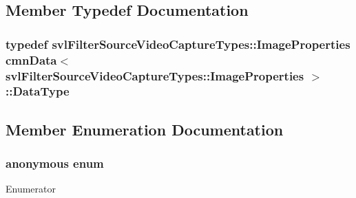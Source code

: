 \subsection{Member Typedef Documentation}
\hypertarget{classcmn_data_3_01svl_filter_source_video_capture_types_1_1_image_properties_01_4_a5e4f9ec9d3c7fa6c707332abbc73cf39}{}
\subsubsection[{Data\+Type}]{\setlength{\rightskip}{0pt plus 5cm}typedef {\bf svl\+Filter\+Source\+Video\+Capture\+Types\+::\+Image\+Properties} {\bf cmn\+Data}$<$ {\bf svl\+Filter\+Source\+Video\+Capture\+Types\+::\+Image\+Properties} $>$\+::{\bf Data\+Type}}\label{classcmn_data_3_01svl_filter_source_video_capture_types_1_1_image_properties_01_4_a5e4f9ec9d3c7fa6c707332abbc73cf39}


\subsection{Member Enumeration Documentation}
\hypertarget{classcmn_data_3_01svl_filter_source_video_capture_types_1_1_image_properties_01_4_aa475b1462e96bb310fa6da5f75631336}{}\subsubsection[{anonymous enum}]{\setlength{\rightskip}{0pt plus 5cm}anonymous enum}\label{classcmn_data_3_01svl_filter_source_video_capture_types_1_1_image_properties_01_4_aa475b1462e96bb310fa6da5f75631336}
\begin{Desc}
\item[Enumerator]\par
\begin{description}
\item[{\em 
\hypertarget{classcmn_data_3_01svl_filter_source_video_capture_types_1_1_image_properties_01_4_aa475b1462e96bb310fa6da5f75631336a70e556b7255e5604e78fbc82545e271b}{}I\+S\+\_\+\+S\+P\+E\+C\+I\+A\+L\+I\+Z\+E\+D\label{classcmn_data_3_01svl_filter_source_video_capture_types_1_1_image_properties_01_4_aa475b1462e96bb310fa6da5f75631336a70e556b7255e5604e78fbc82545e271b}
}]\end{description}
\end{Desc}



